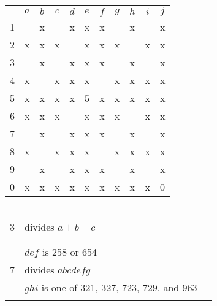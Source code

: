 \begin{center}
\begin{tabular}{ccccccccccc}
			&	$a$	&	$b$	&	$c$	&	$d$	&	$e$	&	$f$	&	$g$	&	$h$	&	$i$	&	$j$	\\
	1		&		&	x	&		&	x	&	x	&	x	&		&	x	&		&	x	\\
	2		&	x	&	x	&	x	&		&	x	&	x	&	x	&		&	x	&	x	\\
	3		&		&	x	&		&	x	&	x	&	x	&		&	x	&		&	x	\\
	4		&	x	&		&	x	&	x	&	x	&		&	x	&	x	&	x	&	x	\\
	5		&	x	&	x	&	x	&	x	&	5	&	x	&	x	&	x	&	x	&	x	\\
	6		&	x	&	x	&	x	&		&	x	&	x	&	x	&		&	x	&	x	\\
	7		&		&	x	&		&	x	&	x	&	x	&		&	x	&		&	x	\\
	8		&	x	&		&	x	&	x	&	x	&		&	x	&	x	&	x	&	x	\\
	9		&		&	x	&		&	x	&	x	&	x	&		&	x	&		&	x	\\
	0		&	x	&	x	&	x	&	x	&	x	&	x	&	x	&	x	&	x	&	0	\\
\end{tabular}
\hspace{1cm}\vline\hspace{1cm}
\begin{tabular}{rll}
	& 		\\
	& 		\\
	& 		\\
	3	&	divides $a+b+c$		\\
	& 		\\
	&		\\
	&	$def$ is 258 or 654		\\
	7	&	divides $abcdefg$	\\
		&	$ghi$ is one of 321, 327, 723, 729, and 963 \\
		&	
		&	
\end{tabular}
\end{center}


